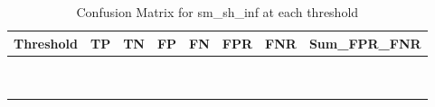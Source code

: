 \begin{table}[!h]
\centering
\caption{Confusion Matrix for sm\_sh\_inf at each threshold}
\centering
\begin{tabular}[t]{rrrrrrrr}
\toprule
Threshold & TP & TN & FP & FN & FPR & FNR & Sum\_FPR\_FNR\\
\midrule
\cellcolor{white}{0.1} & \cellcolor{white}{65} & \cellcolor{white}{1} & \cellcolor{white}{38} & \cellcolor{white}{0} & \cellcolor{white}{0.974} & \cellcolor{white}{0.000} & \cellcolor{white}{0.974}\\
\cellcolor{gray!10}{0.2} & \cellcolor{gray!10}{64} & \cellcolor{gray!10}{2} & \cellcolor{gray!10}{37} & \cellcolor{gray!10}{1} & \cellcolor{gray!10}{0.949} & \cellcolor{gray!10}{0.015} & \cellcolor{gray!10}{0.964}\\
\cellcolor{white}{0.3} & \cellcolor{white}{64} & \cellcolor{white}{2} & \cellcolor{white}{37} & \cellcolor{white}{1} & \cellcolor{white}{0.949} & \cellcolor{white}{0.015} & \cellcolor{white}{0.964}\\
\cellcolor{gray!10}{0.4} & \cellcolor{gray!10}{62} & \cellcolor{gray!10}{7} & \cellcolor{gray!10}{32} & \cellcolor{gray!10}{3} & \cellcolor{gray!10}{0.821} & \cellcolor{gray!10}{0.046} & \cellcolor{gray!10}{0.867}\\
\cellcolor{white}{0.5} & \cellcolor{white}{51} & \cellcolor{white}{18} & \cellcolor{white}{21} & \cellcolor{white}{14} & \cellcolor{white}{0.538} & \cellcolor{white}{0.215} & \cellcolor{white}{0.754}\\
\addlinespace
\cellcolor{gray!10}{0.6} & \cellcolor{gray!10}{34} & \cellcolor{gray!10}{30} & \cellcolor{gray!10}{9} & \cellcolor{gray!10}{31} & \cellcolor{gray!10}{0.231} & \cellcolor{gray!10}{0.477} & \cellcolor{gray!10}{0.708}\\
\cellcolor{yellow}{0.7} & \cellcolor{yellow}{25} & \cellcolor{yellow}{37} & \cellcolor{yellow}{2} & \cellcolor{yellow}{40} & \cellcolor{yellow}{0.051} & \cellcolor{yellow}{0.615} & \cellcolor{yellow}{0.667}\\
\cellcolor{gray!10}{0.8} & \cellcolor{gray!10}{8} & \cellcolor{gray!10}{38} & \cellcolor{gray!10}{1} & \cellcolor{gray!10}{57} & \cellcolor{gray!10}{0.026} & \cellcolor{gray!10}{0.877} & \cellcolor{gray!10}{0.903}\\
\cellcolor{white}{0.9} & \cellcolor{white}{4} & \cellcolor{white}{38} & \cellcolor{white}{1} & \cellcolor{white}{61} & \cellcolor{white}{0.026} & \cellcolor{white}{0.938} & \cellcolor{white}{0.964}\\
\bottomrule
\end{tabular}
\end{table}
